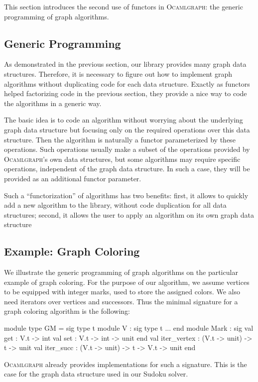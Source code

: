 \documentclass[tfpsymp]{tfp05symp}
\newcommand{\ocamlgraph}{\textsc{Ocamlgraph}\xspace}
\begin{document}
This section introduces the second use of functors in \ocamlgraph: the
generic programming of graph algorithms.

\subsection{Generic Programming}

As demonstrated in the previous section, our library provides many
graph data structures. Therefore, it is necessary to figure out how to
implement graph algorithms without duplicating code for each data
structure. Exactly as functors helped factorizing code in the previous
section, they provide a nice way to code the algorithms in a generic
way.

The basic idea is to code an algorithm without worrying about the
underlying graph data structure but focusing only on the required
operations over this data structure. Then the algorithm is naturally a
functor parameterized by these operations. Such operations usually
make a subset of the operations provided by \ocamlgraph's own data
structures, but some algorithms may require specific operations,
independent of the graph data structure. In such a case, they will be
provided as an additional functor parameter.

Such a ``functorization'' of algorithms has two benefits: first, it
allows to quickly add a new algorithm to the library, without code
duplication for all data structures; second, it allows the user to
apply an algorithm on its own graph data structure%

\subsection{Example: Graph Coloring}
\label{coloring}

We illustrate the generic programming of graph algorithms on the
particular example of graph coloring.  For the purpose of our
algorithm, we assume vertices to be equipped with integer marks, used
to store the assigned colors. We also need iterators over vertices and
successors. Thus the minimal signature for a graph
coloring algorithm is the following:
\begin{ocaml}
module type GM = sig
  type t
  module V : sig type t ... end
  module Mark : sig
    val get : V.t -> int
    val set : V.t -> int -> unit
  end
  val iter_vertex : (V.t -> unit) -> t -> unit
  val iter_succ : (V.t -> unit) -> t -> V.t -> unit
end
\end{ocaml}
\ocamlgraph already provides implementations for such a
signature. This is the case for the graph data structure used in our
Sudoku solver.
\end{document}
